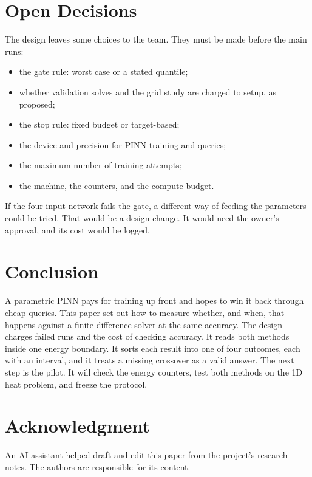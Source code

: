 \documentclass[journal]{IEEEtran}
\begin{document}
\section{Open Decisions}\label{sec:open}

The design leaves some choices to the team. They must be made before the main runs:
\begin{itemize}
\item the gate rule: worst case or a stated quantile;
\item whether validation solves and the grid study are charged to setup, as proposed;
\item the stop rule: fixed budget or target-based;
\item the device and precision for PINN training and queries;
\item the maximum number of training attempts;
\item the machine, the counters, and the compute budget.
\end{itemize}
If the four-input network fails the gate, a different way of feeding the parameters could be tried. That would be a design change. It would need the owner's approval, and its cost would be logged.

\section{Conclusion}\label{sec:conclusion}

A parametric PINN pays for training up front and hopes to win it back through cheap queries. This paper set out how to measure whether, and when, that happens against a finite-difference solver at the same accuracy. The design charges failed runs and the cost of checking accuracy. It reads both methods inside one energy boundary. It sorts each result into one of four outcomes, each with an interval, and it treats a missing crossover as a valid answer. The next step is the pilot. It will check the energy counters, test both methods on the 1D heat problem, and freeze the protocol.

\section*{Acknowledgment}
An AI assistant helped draft and edit this paper from the project's research notes. The authors are responsible for its content.



\end{document}
